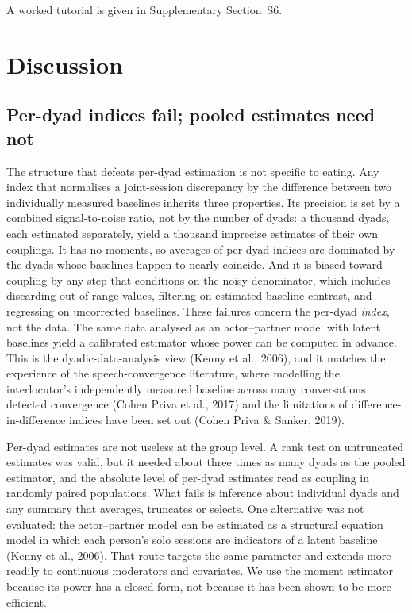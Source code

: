 \documentclass[12pt]{article}
\begin{document}
\noindent A worked tutorial is given in Supplementary Section~S6.

\section*{Discussion}

\subsection*{Per-dyad indices fail; pooled estimates need not}

The structure that defeats per-dyad estimation is not specific to eating. Any
index that normalises a joint-session discrepancy by the difference between two
individually measured baselines inherits three properties. Its precision is set
by a combined signal-to-noise ratio, not by the number of dyads: a thousand
dyads, each estimated separately, yield a thousand imprecise estimates of their
own couplings. It has no
moments, so averages of per-dyad indices are dominated by the dyads whose
baselines happen to nearly coincide. And it is biased toward coupling by any
step that conditions on the noisy denominator, which includes discarding
out-of-range values, filtering on estimated baseline contrast, and regressing on
uncorrected baselines. These failures concern the per-dyad \emph{index}, not the
data. The same data analysed as an actor--partner model with latent baselines
yield a calibrated estimator whose power can be computed in advance. This is the
dyadic-data-analysis view (Kenny et al., 2006), and it matches the experience of
the speech-convergence literature, where modelling the interlocutor's
independently measured baseline across many conversations detected convergence
(Cohen Priva et al., 2017) and the limitations of difference-in-difference indices
have been set out (Cohen Priva \& Sanker, 2019).

Per-dyad estimates are not useless at the group level. A rank test on untruncated
estimates was valid, but it needed about three times as many dyads as the pooled
estimator, and the absolute level of per-dyad estimates read as coupling in randomly
paired populations. What fails is inference about individual dyads and any summary
that averages, truncates or selects. One alternative was not evaluated: the
actor--partner model can be estimated as a structural
equation model in which each person's solo sessions are indicators of a latent
baseline (Kenny et al., 2006). That route targets the same parameter and extends
more readily to continuous moderators and covariates. We use the moment estimator
because its power has a closed form, not because it has been shown to be more
efficient.
\end{document}
